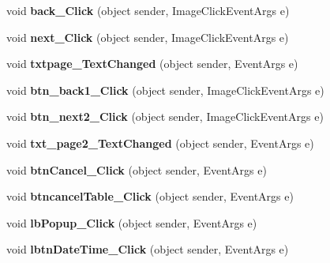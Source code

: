 \begin{DoxyCompactItemize}
\item 
\hypertarget{classusertrackothers__fitness_a21197a72c4b30aa2965d4cf60799e1bd}{void {\bfseries back\-\_\-\-Click} (object sender, Image\-Click\-Event\-Args e)}\label{classusertrackothers__fitness_a21197a72c4b30aa2965d4cf60799e1bd}

\item 
\hypertarget{classusertrackothers__fitness_add1f07264d6027c5961437c916687102}{void {\bfseries next\-\_\-\-Click} (object sender, Image\-Click\-Event\-Args e)}\label{classusertrackothers__fitness_add1f07264d6027c5961437c916687102}

\item 
\hypertarget{classusertrackothers__fitness_ab575dc9c25deaa0d7227b79310d66661}{void {\bfseries txtpage\-\_\-\-Text\-Changed} (object sender, Event\-Args e)}\label{classusertrackothers__fitness_ab575dc9c25deaa0d7227b79310d66661}

\item 
\hypertarget{classusertrackothers__fitness_a7e7a51d814e6b867fd5e2bb9b053c0e6}{void {\bfseries btn\-\_\-back1\-\_\-\-Click} (object sender, Image\-Click\-Event\-Args e)}\label{classusertrackothers__fitness_a7e7a51d814e6b867fd5e2bb9b053c0e6}

\item 
\hypertarget{classusertrackothers__fitness_abd2a5842f5d914c453c32e9ec12bad48}{void {\bfseries btn\-\_\-next2\-\_\-\-Click} (object sender, Image\-Click\-Event\-Args e)}\label{classusertrackothers__fitness_abd2a5842f5d914c453c32e9ec12bad48}

\item 
\hypertarget{classusertrackothers__fitness_ae077f474dd046a0ac1ba57fd29af285a}{void {\bfseries txt\-\_\-page2\-\_\-\-Text\-Changed} (object sender, Event\-Args e)}\label{classusertrackothers__fitness_ae077f474dd046a0ac1ba57fd29af285a}

\item 
\hypertarget{classusertrackothers__fitness_a7a12838c36001c75960626fe36efb214}{void {\bfseries btn\-Cancel\-\_\-\-Click} (object sender, Event\-Args e)}\label{classusertrackothers__fitness_a7a12838c36001c75960626fe36efb214}

\item 
\hypertarget{classusertrackothers__fitness_a83e32acbc53301a25d2ed031a8b6272c}{void {\bfseries btncancel\-Table\-\_\-\-Click} (object sender, Event\-Args e)}\label{classusertrackothers__fitness_a83e32acbc53301a25d2ed031a8b6272c}

\item 
\hypertarget{classusertrackothers__fitness_aa8039939264c0322f10d1db6064e4367}{void {\bfseries lb\-Popup\-\_\-\-Click} (object sender, Event\-Args e)}\label{classusertrackothers__fitness_aa8039939264c0322f10d1db6064e4367}

\item 
\hypertarget{classusertrackothers__fitness_a453037388a799733ef6c0e3c5068699b}{void {\bfseries lbtn\-Date\-Time\-\_\-\-Click} (object sender, Event\-Args e)}\label{classusertrackothers__fitness_a453037388a799733ef6c0e3c5068699b}

\end{DoxyCompactItemize}


